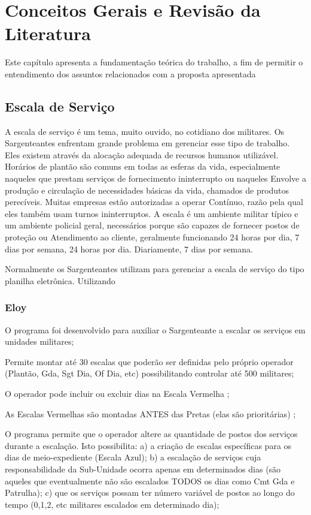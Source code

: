 \chapter{Conceitos Gerais e Revisão da Literatura}
Este capítulo apresenta a fundamentação teórica do trabalho, a fim de permitir o entendimento dos assuntos relacionados com a proposta apresentada

\section{Escala de Serviço}

A escala de serviço é um tema, muito ouvido, no cotidiano dos militares.
Os Sargenteantes enfrentam grande problema em gerenciar esse tipo de trabalho.
Eles existem através da alocação adequada de recursos humanos utilizável. Horários de plantão são comuns em todas as esferas da vida, especialmente naqueles que prestam serviços de fornecimento ininterrupto ou naqueles Envolve a produção e circulação de necessidades básicas da vida, chamados de produtos perecíveis. Muitas empresas estão autorizadas a operar Contínuo, razão pela qual eles também usam turnos ininterruptos. A escala é um ambiente militar típico e um ambiente policial geral,
necessários porque são capazes de fornecer postos de proteção ou
Atendimento ao cliente, geralmente funcionando 24 horas por dia, 7 dias por semana, 24 horas por dia.
Diariamente, 7 dias por semana.

Normalmente os Sargenteantes utilizam para gerenciar a escala de serviço do tipo planilha eletrônica. Utilizando 

\subsection{Eloy}
O programa foi desenvolvido para auxiliar o Sargenteante a escalar os serviços em unidades militares;

Permite montar até 30 escalas que poderão ser definidas pelo próprio operador (Plantão, Gda, Sgt Dia, Of Dia, etc) possibilitando controlar até 500 militares;

O operador pode incluir ou excluir dias na Escala Vermelha ;

As Escalas Vermelhas são montadas ANTES das Pretas (elas são prioritárias) ;

O programa permite que o operador altere as quantidade de postos dos serviços durante a escalação. Isto possibilita: a) a criação de escalas específicas para os dias de meio-expediente (Escala Azul); b) a escalação de serviços cuja responsabilidade da Sub-Unidade ocorra apenas em determinados dias (são aqueles que eventualmente não são escalados TODOS os dias como Cmt Gda e Patrulha); c) que os serviços possam ter número variável de postos ao longo do tempo (0,1,2, etc militares escalados em determinado dia);

